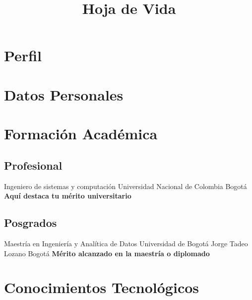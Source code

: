 \documentclass[10pt,letter,sans]{moderncv}
\title{Hoja de Vida} %
\begin{document}
 
\maketitle
 
\section{Perfil}
 
 
\section{Datos Personales} %
 
 
\section{Formación Académica}
 
\subsection{Profesional} %
 
{Ingeniero de sistemas y computaci\'on}
{Universidad Nacional de Colombia}
{Bogot\'a}
{\textit{}}
{\textbf{Aquí destaca tu mérito universitario}}{}
 
\subsection{Posgrados} %
 
{Maestr\'ia en Ingenier\'ia y Anal\'itica de Datos}
{Universidad de Bogot\'a Jorge Tadeo Lozano}
{Bogot\'a}
{\textit{}}
{\textbf{Mérito alcanzado en la maestría o diplomado}}
 
 
\section{Conocimientos Tecnológicos}
 
\end{document}
